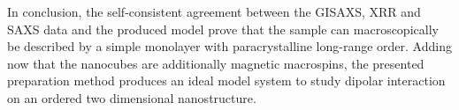 \documentclass[\main/dresen_thesis.tex]{subfiles}
\begin{document}
  In conclusion, the self-consistent agreement between the GISAXS, XRR and SAXS data and the produced model prove that the sample can macroscopically be described by a simple monolayer with paracrystalline long-range order.
  Adding now that the nanocubes are additionally magnetic macrospins, the presented preparation method produces an ideal model system to study dipolar interaction on an ordered two dimensional nanostructure.
\end{document}
